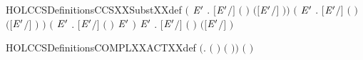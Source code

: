 \begin{SaveVerbatim}{HOLCCSDefinitionsCCSXXSubstXXdef}
   \ensuremath{(}\HOLSymConst{\HOLTokenForall{}}  \ensuremath{\HOLBoundVar{E}\sp{\prime{}}} . \ensuremath{[}\ensuremath{\HOLBoundVar{E}\sp{\prime{}}}\ensuremath{/}\ensuremath{]} \ensuremath{(}  \ensuremath{)} \HOLSymConst{\ensuremath{=}}   \ensuremath{(}\ensuremath{[}\ensuremath{\HOLBoundVar{E}\sp{\prime{}}}\ensuremath{/}\ensuremath{]} \ensuremath{)}\ensuremath{)} \HOLSymConst{\HOLTokenConj{}}
   \ensuremath{(}\HOLSymConst{\HOLTokenForall{}}  \ensuremath{\HOLBoundVar{E}\sp{\prime{}}} . \ensuremath{[}\ensuremath{\HOLBoundVar{E}\sp{\prime{}}}\ensuremath{/}\ensuremath{]} \ensuremath{(}  \ensuremath{)} \HOLSymConst{\ensuremath{=}}  \ensuremath{(}\ensuremath{[}\ensuremath{\HOLBoundVar{E}\sp{\prime{}}}\ensuremath{/}\ensuremath{]} \ensuremath{)} \ensuremath{)} \HOLSymConst{\HOLTokenConj{}}
   \ensuremath{(}\HOLSymConst{\HOLTokenForall{}} \ensuremath{\HOLBoundVar{E}\sp{\prime{}}} . \ensuremath{[}\ensuremath{\HOLBoundVar{E}\sp{\prime{}}}\ensuremath{/}\ensuremath{]} \ensuremath{(} \ensuremath{)} \HOLSymConst{\ensuremath{=}}   \HOLSymConst{\ensuremath{=}}   \ensuremath{\HOLBoundVar{E}\sp{\prime{}}}   \ensuremath{)} \HOLSymConst{\HOLTokenConj{}}
   \HOLSymConst{\HOLTokenForall{}}  \ensuremath{\HOLBoundVar{E}\sp{\prime{}}} .
     \ensuremath{[}\ensuremath{\HOLBoundVar{E}\sp{\prime{}}}\ensuremath{/}\ensuremath{]} \ensuremath{(}  \ensuremath{)} \HOLSymConst{\ensuremath{=}}
       \HOLSymConst{\ensuremath{=}}         \ensuremath{(}\ensuremath{[}\ensuremath{\HOLBoundVar{E}\sp{\prime{}}}\ensuremath{/}\ensuremath{]} \ensuremath{)}
\end{SaveVerbatim}
\newcommand{\HOLCCSDefinitionsCCSXXSubstXXdef}{\UseVerbatim{HOLCCSDefinitionsCCSXXSubstXXdef}}
\begin{SaveVerbatim}{HOLCCSDefinitionsCOMPLXXACTXXdef}
\HOLTokenTurnstile{} \ensuremath{(}\HOLSymConst{\HOLTokenForall{}}.  \ensuremath{(} \ensuremath{)} \HOLSymConst{\ensuremath{=}}  \ensuremath{(} \ensuremath{)}\ensuremath{)} \HOLSymConst{\HOLTokenConj{}} \ensuremath{(} \HOLConst{\ensuremath{\tau}} \HOLSymConst{\ensuremath{=}} \HOLConst{\ensuremath{\tau}}\ensuremath{)}
\end{SaveVerbatim}
